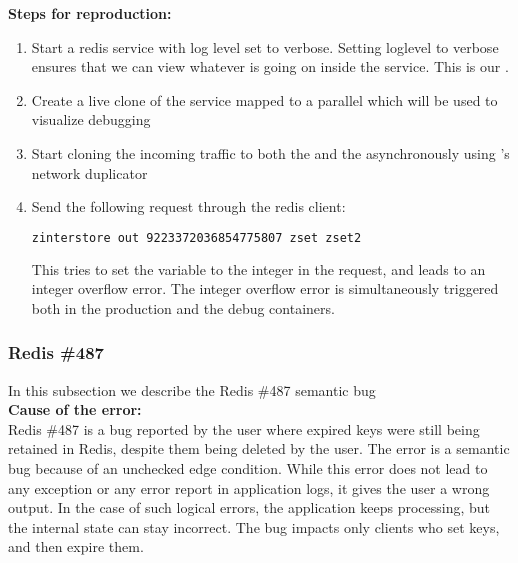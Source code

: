 \noindent \textbf{Steps for reproduction:}\\

\begin{adjustwidth}{0.5cm}{}
\begin{enumerate}
	\item Start a redis service with log level set to verbose. Setting loglevel to verbose ensures that we can view whatever is going on inside the service. This is our \productioncontainer.
	\item Create a live clone of the service mapped to a parallel \debugcontainer which will be used to visualize debugging
	\item Start cloning the incoming traffic to both the \productioncontainer and the \debugcontainer asynchronously using \parikshan's network duplicator
	\item Send the following request through the redis client: 
	
		\begin{lstlisting}[language=sh]
		zinterstore out 9223372036854775807 zset zset2
		\end{lstlisting}
		
		This tries to set the variable to the integer in the request, and leads to an integer overflow error. The integer overflow error is simultaneously triggered both in the production and the debug containers.
	
\end{enumerate}
\end{adjustwidth}


\subsubsection{Redis \#487}

In this subsection we describe the Redis \#487 semantic bug \\

\noindent \textbf{Cause of the error:} \\
Redis \#487 is a bug reported by the user where expired keys were still being retained in Redis, despite them being deleted by the user.
The error is a semantic bug because of an unchecked edge condition.
While this error does not lead to any exception or any error report in application logs, it gives the user a wrong output.
In the case of such logical errors, the application keeps processing, but the internal state can stay incorrect.
The bug impacts only clients who set keys, and then expire them.\\

